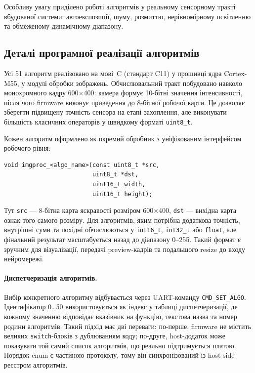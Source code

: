 \documentclass[a4paper,12pt]{article}
\begin{document}
Особливу увагу приділено роботі алгоритмів у реальному сенсорному тракті вбудованої системи: автоекспозиції, шуму, розмиттю, нерівномірному освітленню та обмеженому динамічному діапазону.

\subsection{Деталі програмної реалізації алгоритмів}

Усі 51 алгоритм реалізовано на мові~C (стандарт C11) у прошивці ядра Cortex-M55, у модулі обробки зображень. Обчислювальний тракт побудовано навколо монохромного кадру 600$\times$400: камера формує 10-бітні значення інтенсивності, після чого firmware виконує приведення до 8-бітної робочої карти. Це дозволяє зберегти підвищену точність сенсора на етапі захоплення, але виконувати більшість класичних операторів у швидкому форматі \texttt{uint8\_t}.

Кожен алгоритм оформлено як окремий обробник з уніфікованим інтерфейсом робочого рівня:

\begin{verbatim}
void imgproc_<algo_name>(const uint8_t *src,
						 uint8_t *dst,
						 uint16_t width,
						 uint16_t height);
\end{verbatim}

Тут \texttt{src} --- 8-бітна карта яскравості розміром 600$\times$400, \texttt{dst} --- вихідна карта ознак того самого розміру. Для алгоритмів, яким потрібна додаткова точність, внутрішні суми та похідні обчислюються у \texttt{int16\_t}, \texttt{int32\_t} або \texttt{float}, але фінальний результат масштабується назад до діапазону 0--255. Такий формат є зручним для візуалізації, передачі preview-кадрів та подальшого resize до входу нейромережі.

\paragraph{Диспетчеризація алгоритмів.}
Вибір конкретного алгоритму відбувається через UART-команду \texttt{CMD\_SET\_ALGO}. Ідентифікатор 0\ldots50 використовується як індекс у таблиці диспетчеризації, де кожному значенню відповідає вказівник на функцію, текстова назва та номер родини алгоритмів. Такий підхід має дві переваги: по-перше, firmware не містить великих \texttt{switch}-блоків з дублюванням коду; по-друге, host-додаток може показувати той самий список алгоритмів, що реально підтримується платою. Порядок enum є частиною протоколу, тому він синхронізований із host-side реєстром алгоритмів.
\end{document}
